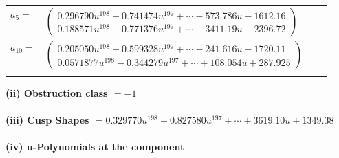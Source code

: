 \documentclass[1p]{elsarticle_modified}
\theoremstyle{definition}
\begin{document}
\begin{tabular}{m{7pt} m{180pt} m{7pt} m{180pt} }
\flushright $a_{5}=$&$\begin{pmatrix}0.296790 u^{198}-0.741474 u^{197}+\cdots-573.786 u-1612.16\\0.188571 u^{198}-0.771376 u^{197}+\cdots-3411.19 u-2396.72\end{pmatrix}$ \\
\flushright $a_{10}=$&$\begin{pmatrix}0.205050 u^{198}-0.599328 u^{197}+\cdots-241.616 u-1720.11\\0.0571877 u^{198}-0.344279 u^{197}+\cdots+108.054 u+287.925\end{pmatrix}$\\&\end{tabular}
\flushleft \textbf{(ii) Obstruction class $= -1$}\\~\\
\flushleft \textbf{(iii) Cusp Shapes $= 0.329770 u^{198}+0.827580 u^{197}+\cdots+3619.10 u+1349.38$}\\~\\
\newpage\renewcommand{\arraystretch}{1}
\flushleft \textbf{(iv) u-Polynomials at the component}\newline \\
\end{document}

